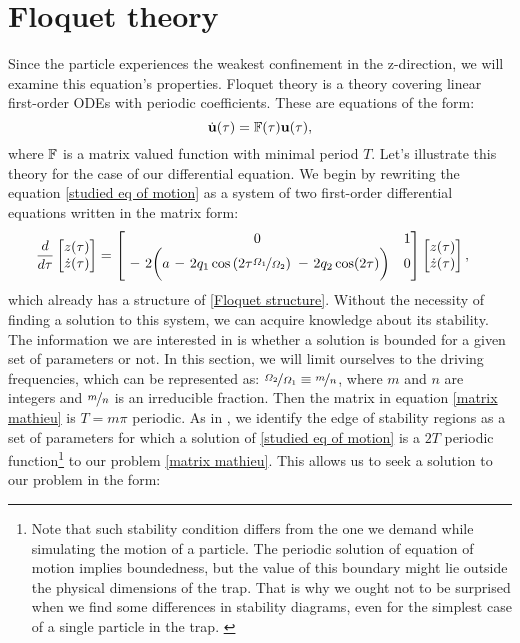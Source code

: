 \section{Floquet theory}
\label{sec:floquet theory}
Since the particle experiences the weakest confinement in the z-direction, we will examine this equation's properties. Floquet theory is a theory covering linear first-order ODEs with periodic coefficients. These are equations of the form:
\begin{equation}
	\label{Floquet structure}
	\dot{\vb{u}}(\tau) = \mathbb{F}(\tau) \vb{u}(\tau),
\end{equation}
where $\mathbb{F}$ is a matrix valued function with minimal period $T$. Let's illustrate this theory for the case of our differential equation. We begin by rewriting the equation \eqref{studied eq of motion} as a system of two first-order differential equations written in the matrix form:
\begin{align}
\label{matrix mathieu}
	\frac{d}{d \tau}
	\begin{bmatrix}
		z(\tau) \\
		\dot{z}(\tau)
	\end{bmatrix}	
	&=
	\begin{bmatrix}
		0 & 1 \\
		\minus 2\bigg( a \minus 2 q_1 \cos\left(2 \tau \nicefrac{\Omega_1}{\Omega_2} \right) \minus 2 q_2 \cos(2\tau) \bigg) & 0	
	\end{bmatrix}
	\begin{bmatrix}
		z(\tau) \\
		\dot{z}(\tau)
	\end{bmatrix},
\end{align}
which already has a structure of \eqref{Floquet structure}. Without the necessity of finding a solution to this system, we can acquire knowledge about its stability. The information we are interested in is whether a solution is bounded for a given set of parameters or not. In this section, we will limit ourselves to the driving frequencies, which can be represented as: $\nicefrac{\Omega_2}{\Omega_1} \equiv \nicefrac{m}{n}$, where $m$ and $n$ are integers and $\nicefrac{m}{n}$ is an irreducible fraction. Then the matrix in equation \eqref{matrix mathieu} is $T = m \pi$ periodic. As in \cite{leefer2017investigation}, we identify the edge of stability regions as a set of parameters for which a solution of \eqref{studied eq of motion} is a $2T$ periodic function\footnote{Note that such stability condition differs from the one we demand while simulating the motion of a particle. The periodic solution of equation of motion implies boundedness, but the value of this boundary might lie outside the physical dimensions of the trap. That is why we ought not to be surprised when we find some differences in stability diagrams, even for the simplest case of a single particle in the trap. \label{foot: different stability condition}} to our problem \eqref{matrix mathieu}. This allows us to seek a solution to our problem in the form:
